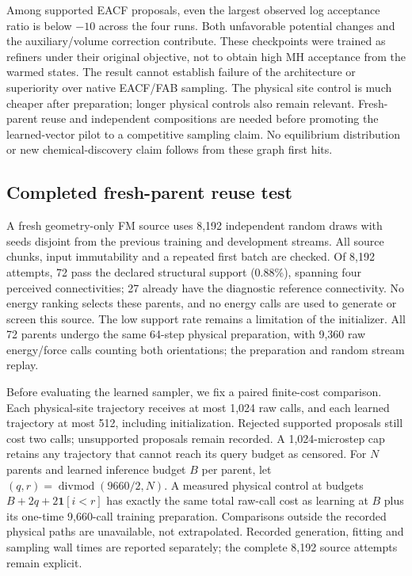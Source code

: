 Among supported EACF proposals, even the largest observed log acceptance ratio
is below $-10$ across the four runs. Both unfavorable potential changes and the
auxiliary/volume correction contribute. These checkpoints were trained as
refiners under their original objective, not to obtain high MH acceptance from
the warmed states. The result cannot establish failure of the architecture or
superiority over native EACF/FAB sampling. The physical site control is much
cheaper after preparation; longer physical controls also remain relevant.
Fresh-parent reuse and independent compositions are needed before promoting the
learned-vector pilot to a competitive sampling claim. No equilibrium distribution
or new chemical-discovery claim follows from these graph first hits.

\subsection{Completed fresh-parent reuse test}

A fresh geometry-only FM source uses 8,192 independent random draws with seeds
disjoint from the previous training and development streams. All source chunks,
input immutability and a repeated first batch are checked. Of 8,192 attempts,
72 pass the declared structural support (0.88\%), spanning four perceived
connectivities; 27 already have the diagnostic reference connectivity. No energy
ranking selects these parents, and no energy calls are used to generate or
screen this source. The low support rate remains a limitation of the initializer.
All 72 parents undergo the same 64-step physical preparation, with 9,360 raw
energy/force calls counting both orientations; the preparation and random stream replay.

Before evaluating the learned sampler, we fix a paired finite-cost comparison.
Each physical-site trajectory receives at most 1,024 raw calls, and each learned
trajectory at most 512, including initialization. Rejected supported proposals
still cost two calls; unsupported proposals remain recorded. A 1,024-microstep
cap retains any trajectory that cannot reach its query budget as censored.
For $N$ parents and learned inference budget $B$ per parent, let
$(q,r)=\operatorname{divmod}(9660/2,N)$. A measured physical control at budgets
$B+2q+2\mathbf 1[i<r]$ has exactly the same total raw-call cost as learning at $B$
plus its one-time 9,660-call training preparation. Comparisons outside the
recorded physical paths are unavailable, not extrapolated. Recorded generation,
fitting and sampling wall times are reported separately; the complete 8,192
source attempts remain explicit.

